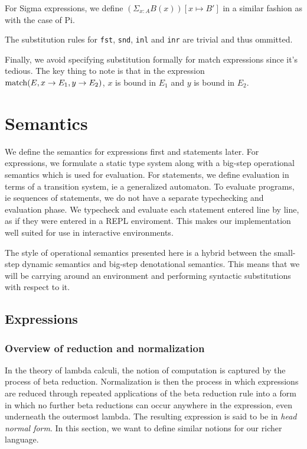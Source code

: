 \documentclass{article}
\begin{document}
For Sigma expressions, we define $(\Sigma_{x : A} B(x)) [x \mapsto B']$ in a
similar fashion as with the case of Pi.

The substitution rules for \verb|fst|, \verb|snd|, \verb|inl| and \verb|inr| are
trivial and thus ommitted.

Finally, we avoid specifying substitution formally for match expressions since it's
tedious. The key thing to note is that in the expression
$\operatorname{match}(E, x \rightarrow E_1, y \rightarrow E_2)$, $x$ is bound in $E_1$ and $y$
is bound in $E_2$.

\section{Semantics}
We define the semantics for expressions first and statements later.
For expressions, we formulate a static type system along with a big-step
operational semantics which is used for evaluation.
For statements, we define evaluation in terms of a transition system, ie a
generalized automaton.
To evaluate programs, ie sequences of statements, we do not have a separate
typechecking and evaluation phase. We typecheck and evaluate each statement
entered line by line, as if they were entered in a REPL enviroment.
This makes our implementation well suited for use in interactive environments.

The style of operational semantics presented here is a hybrid between the
small-step dynamic semantics and big-step denotational semantics.
This means that we will be carrying around an environment and performing
syntactic substitutions with respect to it.

\begin{comment}
  https://www.andres-loeh.de/LambdaPi/LambdaPi.pdf
  http://math.andrej.com/2012/11/08/how-to-implement-dependent-type-theory-i/
  
  http://fsl.cs.illinois.edu/images/archive/b/b3/20110221180817!CS522-Spring-2011-PL-book-bigstep.pdf
  https://www.cs.cornell.edu/courses/cs4110/2010fa/lectures/lecture03.pdf
\end{comment}

\subsection{Expressions}
\subsubsection{Overview of reduction and normalization}
In the theory of lambda calculi, the notion of computation is captured by the
process of beta reduction. Normalization is then the process in which
expressions are reduced through repeated applications of the beta reduction
rule into a form in which no further beta reductions can occur anywhere in the
expression, even underneath the outermost lambda.
The resulting expression is said to be in \textit{head normal form}. 
In this section, we want to define similar notions for our richer language.
\end{document}
